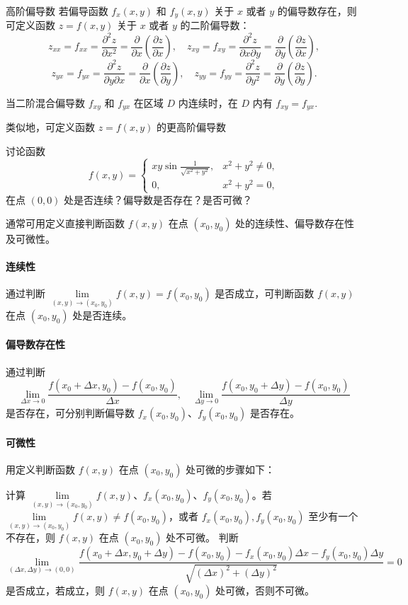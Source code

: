 \begin{dy}{高阶偏导数}{}
若偏导函数 \( f_x(x,y) \) 和 \( f_y(x,y) \) 关于 \( x \) 或者 \( y \) 的偏导数存在，则可定义函数 \( z = f(x,y) \) 关于 \( x \) 或者 \( y \) 的二阶偏导数：
\[
z_{xx} = f_{xx} = \frac{\partial^2 z}{\partial x^2} = \frac{\partial}{\partial x}\left( \frac{\partial z}{\partial x} \right),
\quad
z_{xy} = f_{xy} = \frac{\partial^2 z}{\partial x\partial y} = \frac{\partial}{\partial y}\left( \frac{\partial z}{\partial x} \right),
\]
\[
z_{yx} = f_{yx} = \frac{\partial^2 z}{\partial y\partial x} = \frac{\partial}{\partial x}\left( \frac{\partial z}{\partial y} \right),
\quad
z_{yy} = f_{yy} = \frac{\partial^2 z}{\partial y^2} = \frac{\partial}{\partial y}\left( \frac{\partial z}{\partial y} \right).
\]

当二阶混合偏导数 \( f_{xy} \) 和 \( f_{yx} \) 在区域 \( D \) 内连续时，在 \( D \) 内有 \( f_{xy} = f_{yx} \).

类似地，可定义函数 \( z = f(x,y) \) 的更高阶偏导数
\end{dy}
\begin{problem}
    讨论函数
\[
f(x,y) =
\begin{cases}
xy\sin\frac{1}{\sqrt{x^2+y^2}}, & x^2+y^2 \neq 0, \\
0, & x^2+y^2 = 0,
\end{cases}
\]
在点 \( (0,0) \) 处是否连续？偏导数是否存在？是否可微？
\end{problem}
\begin{note}
    通常可用定义直接判断函数 \( f(x,y) \) 在点 \( (x_0,y_0) \) 处的连续性、偏导数存在性及可微性。

\paragraph{连续性}
通过判断 \( \lim\limits_{(x,y)\to(x_0,y_0)} f(x,y) = f(x_0,y_0) \) 是否成立，可判断函数 \( f(x,y) \) 在点 \( (x_0,y_0) \) 处是否连续。

\paragraph{偏导数存在性}
通过判断
\[
\lim_{\Delta x \to 0} \frac{f(x_0+\Delta x,y_0) - f(x_0,y_0)}{\Delta x},
\quad
\lim_{\Delta y \to 0} \frac{f(x_0,y_0+\Delta y) - f(x_0,y_0)}{\Delta y}
\]
是否存在，可分别判断偏导数 \( f_x(x_0,y_0) \)、\( f_y(x_0,y_0) \) 是否存在。

\paragraph{可微性}
用定义判断函数 \( f(x,y) \) 在点 \( (x_0,y_0) \) 处可微的步骤如下：

     计算 \( \lim\limits_{(x,y)\to(x_0,y_0)} f(x,y) \)、\( f_x(x_0,y_0) \)、\( f_y(x_0,y_0) \)。若 \( \lim\limits_{(x,y)\to(x_0,y_0)} f(x,y) \neq f(x_0,y_0) \)，或者 \( f_x(x_0,y_0), f_y(x_0,y_0) \) 至少有一个不存在，则 \( f(x,y) \) 在点 \( (x_0,y_0) \) 处不可微。
     判断
    \[
    \lim\limits_{(\Delta x,\Delta y)\to(0,0)} \frac{f(x_0+\Delta x,y_0+\Delta y)-f(x_0,y_0)-f_x(x_0,y_0)\Delta x-f_y(x_0,y_0)\Delta y}{\sqrt{(\Delta x)^2+(\Delta y)^2}} = 0
    \]
    是否成立，若成立，则 \( f(x,y) \) 在点 \( (x_0,y_0) \) 处可微，否则不可微。
\end{note}
